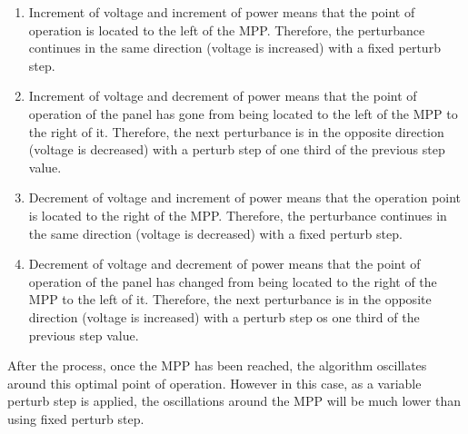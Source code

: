 \begin{enumerate}
\item Increment of voltage and increment of power means that the point of operation is located to the left of the MPP. Therefore, the perturbance continues in the same direction (voltage is increased) with a fixed perturb step. 
\item Increment of voltage and decrement of power means that the point of operation of the panel has gone from being located to the left of the MPP to the right of it. Therefore, the next perturbance is in the opposite direction (voltage is decreased) with a perturb step of one third of the previous step value.
\item Decrement of voltage and increment of power means that the operation point is located to the right of the MPP. Therefore, the perturbance continues in the same direction (voltage is decreased) with a fixed perturb step. 
\item Decrement of voltage and decrement of power means that the point of operation of the panel has changed from being located to the right of the MPP to the left of it. Therefore, the next perturbance is in the opposite direction (voltage is increased) with a perturb step os one third of the previous step value.
\end{enumerate}

After the process, once the MPP has been reached, the algorithm oscillates around this optimal point of operation. However in this case, as a variable perturb step is applied, the oscillations around the MPP will be much lower than using fixed perturb step.  

